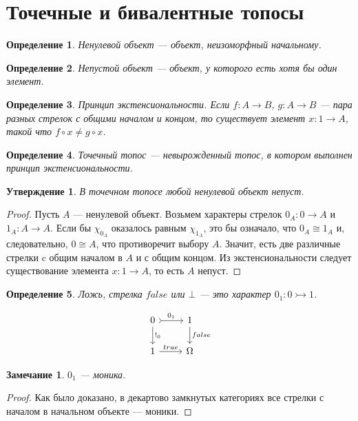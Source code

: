 \documentclass[a4paper, 12pt]{article}
\newtheorem{definition}{Определение}
\newtheorem{exercise}{Утверждение}
\newtheorem{note}{Замечание}
\begin{document}
\pagebreak
\section{Точечные и бивалентные топосы}

\begin{definition}
Ненулевой объект --- объект, неизоморфный начальному. 
\end{definition}

\begin{definition}
Непустой объект --- объект, у которого есть хотя бы один элемент.
\end{definition}

\begin{definition}
Принцип экстенсиональности. Если $f\colon A\to B$, $g\colon A\to B$ --- пара разных стрелок с общими началом и концом, то существует элемент $x\colon 1\to A$, такой что $f \circ x \ne g \circ x$.
\end{definition}

\begin{definition}
Точечный топос --- невырожденный топос, в котором выполнен принцип экстенсиональности. 
\end{definition}

\begin{exercise}
В точечном топосе любой ненулевой объект непуст.
\end{exercise}
\begin{proof}
Пусть $A$ --- ненулевой объект. Возьмем характеры стрелок $0_A\colon 0\to A$ и $1_A\colon A\to A$. Если бы $\chi_{0_A}$ оказалось равным $\chi_{1_A}$, это бы означало, что $0_A\cong 1_A$ и, следовательно, $0\cong A$, что противоречит выбору $A$. Значит, есть две различные стрелки c общим началом в $A$ и с общим концом. Из экстенсиональности следует существование элемента $x\colon 1\to A$, то есть $A$ непуст.\end{proof}

\begin{definition}
Ложь, стрелка $false$ или $\bot$ --- это характер $0_1\colon 0\rightarrowtail 1$.

\[
\begin{tikzcd}
0 \arrow{d}{!_0} \arrow[tail]{r}{0_1}
& 1 \arrow{d}{false} \\
1 \arrow{r}{true}
& \Omega
\end{tikzcd}
\]

\end{definition}
\begin{note}
$0_1$ --- моника.
\end{note}
\begin{proof}
Как было доказано, в декартово замкнутых категориях все стрелки с началом в начальном объекте --- моники.\end{proof}
\end{document}
